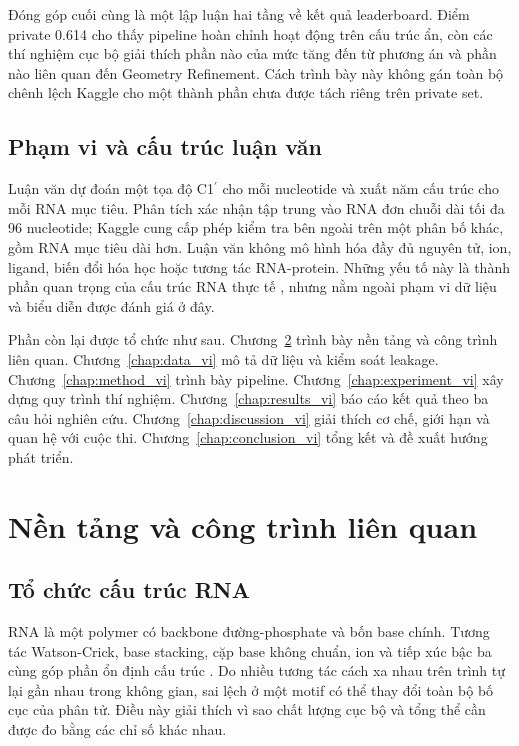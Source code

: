 \documentclass[12pt,a4paper,oneside]{report}
\newcommand{\cprime}{C1$^{\prime}$}
\begin{document}
Đóng góp cuối cùng là một lập luận hai tầng về kết quả leaderboard. Điểm private 0.614
cho thấy pipeline hoàn chỉnh hoạt động trên cấu trúc ẩn, còn các thí nghiệm cục bộ giải
thích phần nào của mức tăng đến từ phương án và phần nào liên quan đến Geometry
Refinement. Cách trình bày này không gán toàn bộ chênh lệch Kaggle cho một thành phần
chưa được tách riêng trên private set.

\section{Phạm vi và cấu trúc luận văn}

Luận văn dự đoán một tọa độ \cprime{} cho mỗi nucleotide và xuất năm cấu trúc cho mỗi
RNA mục tiêu. Phân tích xác nhận tập trung vào RNA đơn chuỗi dài tối đa 96 nucleotide;
Kaggle cung cấp phép kiểm tra bên ngoài trên một phân bố khác, gồm RNA mục tiêu dài hơn. Luận
văn không mô hình hóa đầy đủ nguyên tử, ion, ligand, biến đổi hóa học hoặc tương tác
RNA-protein. Những yếu tố này là thành phần quan trọng của cấu trúc RNA thực tế
\cite{butcher_tertiary,zhang_experimental_review}, nhưng nằm ngoài phạm vi dữ liệu và
biểu diễn được đánh giá ở đây.

Phần còn lại được tổ chức như sau. Chương~\ref{chap:background_vi} trình bày nền tảng và
công trình liên quan. Chương~\ref{chap:data_vi} mô tả dữ liệu và kiểm soát leakage.
Chương~\ref{chap:method_vi} trình bày pipeline. Chương~\ref{chap:experiment_vi} xây dựng
quy trình thí nghiệm. Chương~\ref{chap:results_vi} báo cáo kết quả theo ba câu hỏi nghiên
cứu. Chương~\ref{chap:discussion_vi} giải thích cơ chế, giới hạn và quan hệ với cuộc thi.
Chương~\ref{chap:conclusion_vi} tổng kết và đề xuất hướng phát triển.

\chapter{Nền tảng và công trình liên quan}
\label{chap:background_vi}

\section{Tổ chức cấu trúc RNA}

RNA là một polymer có backbone đường-phosphate và bốn base chính. Tương tác Watson-Crick,
base stacking, cặp base không chuẩn, ion và tiếp xúc bậc ba cùng góp phần ổn định cấu
trúc \cite{tinoco_folding,butcher_tertiary}. Do nhiều tương tác cách xa nhau trên trình
tự lại gần nhau trong không gian, sai lệch ở một motif có thể thay đổi toàn bộ bố cục
của phân tử. Điều này giải thích vì sao chất lượng cục bộ và tổng thể cần được đo bằng các
chỉ số khác nhau.
\end{document}
